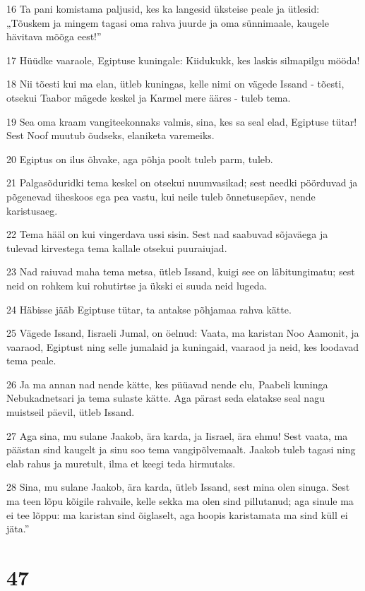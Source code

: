 \par 16 Ta pani komistama paljusid, kes ka langesid üksteise peale ja ütlesid: „Tõuskem ja mingem tagasi oma rahva juurde ja oma sünnimaale, kaugele hävitava mõõga eest!”
\par 17 Hüüdke vaaraole, Egiptuse kuningale: Kiidukukk, kes laskis silmapilgu mööda!
\par 18 Nii tõesti kui ma elan, ütleb kuningas, kelle nimi on vägede Issand - tõesti, otsekui Taabor mägede keskel ja Karmel mere ääres - tuleb tema.
\par 19 Sea oma kraam vangiteekonnaks valmis, sina, kes sa seal elad, Egiptuse tütar! Sest Noof muutub õudseks, elaniketa varemeiks.
\par 20 Egiptus on ilus õhvake, aga põhja poolt tuleb parm, tuleb.
\par 21 Palgasõduridki tema keskel on otsekui nuumvasikad; sest needki pöörduvad ja põgenevad üheskoos ega pea vastu, kui neile tuleb õnnetusepäev, nende karistusaeg.
\par 22 Tema hääl on kui vingerdava ussi sisin. Sest nad saabuvad sõjaväega ja tulevad kirvestega tema kallale otsekui puuraiujad.
\par 23 Nad raiuvad maha tema metsa, ütleb Issand, kuigi see on läbitungimatu; sest neid on rohkem kui rohutirtse ja ükski ei suuda neid lugeda.
\par 24 Häbisse jääb Egiptuse tütar, ta antakse põhjamaa rahva kätte.
\par 25 Vägede Issand, Iisraeli Jumal, on öelnud: Vaata, ma karistan Noo Aamonit, ja vaaraod, Egiptust ning selle jumalaid ja kuningaid, vaaraod ja neid, kes loodavad tema peale.
\par 26 Ja ma annan nad nende kätte, kes püüavad nende elu, Paabeli kuninga Nebukadnetsari ja tema sulaste kätte. Aga pärast seda elatakse seal nagu muistseil päevil, ütleb Issand.
\par 27 Aga sina, mu sulane Jaakob, ära karda, ja Iisrael, ära ehmu! Sest vaata, ma päästan sind kaugelt ja sinu soo tema vangipõlvemaalt. Jaakob tuleb tagasi ning elab rahus ja muretult, ilma et keegi teda hirmutaks.
\par 28 Sina, mu sulane Jaakob, ära karda, ütleb Issand, sest mina olen sinuga. Sest ma teen lõpu kõigile rahvaile, kelle sekka ma olen sind pillutanud; aga sinule ma ei tee lõppu: ma karistan sind õiglaselt, aga hoopis karistamata ma sind küll ei jäta.”

\chapter{47}

